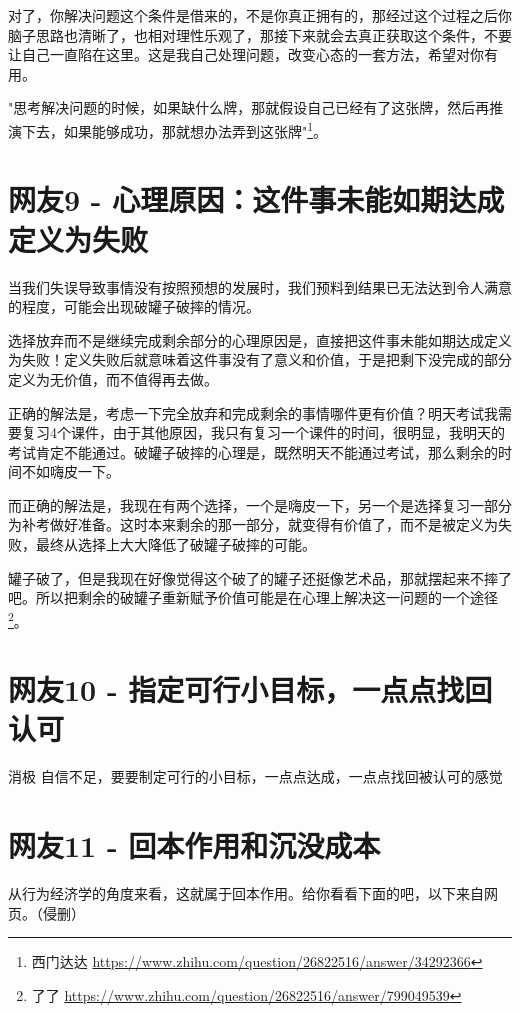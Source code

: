 对了，你解决问题这个条件是借来的，不是你真正拥有的，那经过这个过程之后你脑子思路也清晰了，也相对理性乐观了，那接下来就会去真正获取这个条件，不要让自己一直陷在这里。这是我自己处理问题，改变心态的一套方法，希望对你有用。

"思考解决问题的时候，如果缺什么牌，那就假设自己已经有了这张牌，然后再推演下去，如果能够成功，那就想办法弄到这张牌"\footnote{西门达达 \quad \url{https://www.zhihu.com/question/26822516/answer/34292366}}。

\section{网友9 - 心理原因：这件事未能如期达成定义为失败}

当我们失误导致事情没有按照预想的发展时，我们预料到结果已无法达到令人满意的程度，可能会出现破罐子破摔的情况。       

选择放弃而不是继续完成剩余部分的心理原因是，直接把这件事未能如期达成定义为失败！定义失败后就意味着这件事没有了意义和价值，于是把剩下没完成的部分定义为无价值，而不值得再去做。       

正确的解法是，考虑一下完全放弃和完成剩余的事情哪件更有价值？明天考试我需要复习4个课件，由于其他原因，我只有复习一个课件的时间，很明显，我明天的考试肯定不能通过。破罐子破摔的心理是，既然明天不能通过考试，那么剩余的时间不如嗨皮一下。

而正确的解法是，我现在有两个选择，一个是嗨皮一下，另一个是选择复习一部分为补考做好准备。这时本来剩余的那一部分，就变得有价值了，而不是被定义为失败，最终从选择上大大降低了破罐子破摔的可能。       

罐子破了，但是我现在好像觉得这个破了的罐子还挺像艺术品，那就摆起来不摔了吧。所以把剩余的破罐子重新赋予价值可能是在心理上解决这一问题的一个途径\footnote{了了 \quad \url{https://www.zhihu.com/question/26822516/answer/799049539}}。

\section{网友10 - 指定可行小目标，一点点找回认可}

消极 自信不足，要要制定可行的小目标，一点点达成，一点点找回被认可的感觉

\section{网友11 - 回本作用和沉没成本}

从行为经济学的角度来看，这就属于回本作用。给你看看下面的吧，以下来自网页。（侵删）

